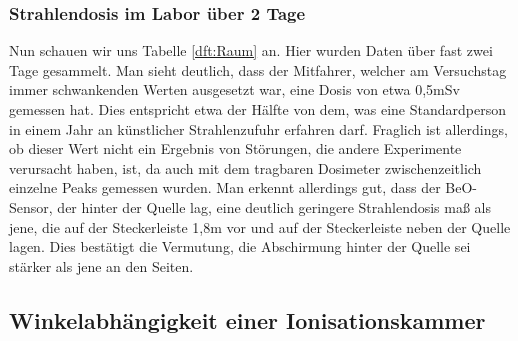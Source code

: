 \subsubsection{Strahlendosis im Labor über 2 Tage}
Nun schauen wir uns Tabelle \ref{dft:Raum} an. Hier wurden Daten über fast zwei Tage gesammelt. Man sieht 
deutlich, dass der Mitfahrer, welcher am Versuchstag immer schwankenden Werten ausgesetzt war, eine Dosis von 
etwa 0,5mSv gemessen hat. Dies entspricht etwa der Hälfte von dem, was eine Standardperson in einem Jahr an 
künstlicher Strahlenzufuhr erfahren darf. Fraglich ist allerdings, ob dieser Wert nicht ein Ergebnis von Störungen, 
die andere Experimente verursacht haben, ist, da auch mit dem tragbaren Dosimeter zwischenzeitlich einzelne Peaks gemessen wurden.
Man erkennt allerdings gut, dass der BeO-Sensor, der hinter der Quelle lag, eine deutlich geringere Strahlendosis maß als jene, die auf der Steckerleiste 1,8m vor und auf der Steckerleiste neben der Quelle lagen. Dies bestätigt die Vermutung, die Abschirmung hinter der Quelle sei stärker als jene an den Seiten.

\subsection{Winkelabhängigkeit einer Ionisationskammer}